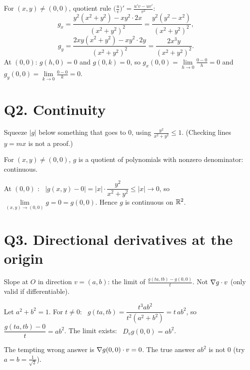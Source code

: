\begin{writethis}
For $(x,y)\ne(0,0)$, quotient rule $\big(\frac uv\big)'=\frac{u'v-uv'}{v^2}$:
\[
 g_x=\frac{y^2(x^2+y^2)-xy^2\cdot2x}{(x^2+y^2)^2}=\frac{y^2(y^2-x^2)}{(x^2+y^2)^2},
\]
\[
 g_y=\frac{2xy(x^2+y^2)-xy^2\cdot2y}{(x^2+y^2)^2}=\frac{2x^3y}{(x^2+y^2)^2}.
\]
At $(0,0)$: $g(h,0)=0$ and $g(0,k)=0$, so
$g_x(0,0)=\lim\limits_{h\to0}\frac{0-0}{h}=0$ and $g_y(0,0)=\lim\limits_{k\to0}\frac{0-0}{k}=0$.
\end{writethis}



\section{Q2. Continuity}

\begin{idea}
Squeeze $|g|$ below something that goes to $0$, using $\frac{y^2}{x^2+y^2}\le1$. (Checking lines $y=mx$ is not a proof.)
\end{idea}

\begin{writethis}
For $(x,y)\ne(0,0)$, $g$ is a quotient of polynomials with nonzero denominator: continuous.

At $(0,0)$ : \ $|g(x,y)-0|=|x|\cdot\dfrac{y^2}{x^2+y^2}\le|x|\to0$, so
$\lim\limits_{(x,y)\to(0,0)}g=0=g(0,0)$. Hence $g$ is continuous on $\mathbb{R}^2$.
\end{writethis}



\section{Q3. Directional derivatives at the origin}

\begin{idea}
Slope at $O$ in direction $v=(a,b)$: the limit of $\frac{g(ta,tb)-g(0,0)}{t}$. Not $\nabla g\cdot v$ (only valid if differentiable).
\end{idea}

\begin{writethis}
Let $a^2+b^2=1$. For $t\ne0$: \ $g(ta,tb)=\dfrac{t^3ab^2}{t^2(a^2+b^2)}=t\,ab^2$, so
$\dfrac{g(ta,tb)-0}{t}=ab^2$. The limit exists: \ $\boxed{D_vg(0,0)=ab^2}$.
\end{writethis}

\begin{watch}\watchout The tempting wrong answer is $\nabla g(0,0)\cdot v=0$. The true answer $ab^2$ is not $0$ (try $a=b=\frac1{\sqrt2}$).\end{watch}

